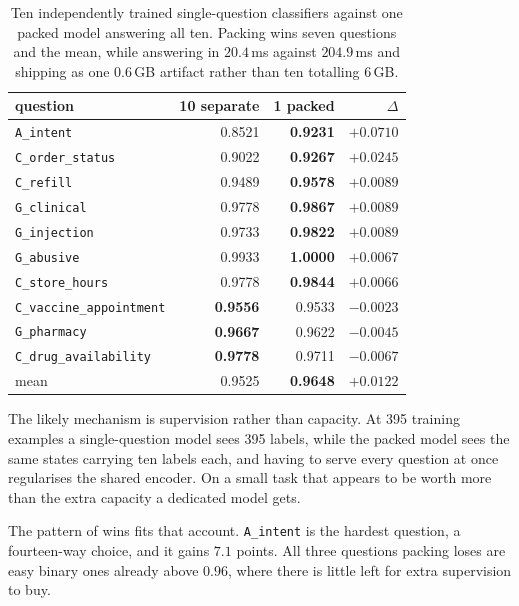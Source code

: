 \begin{table}[h]
\centering
\begin{tabular}{lrrr}
\toprule
question & 10 separate & 1 packed & $\Delta$ \\
\midrule
\texttt{A\_intent}              & 0.8521 & \textbf{0.9231} & $+0.0710$ \\
\texttt{C\_order\_status}       & 0.9022 & \textbf{0.9267} & $+0.0245$ \\
\texttt{C\_refill}              & 0.9489 & \textbf{0.9578} & $+0.0089$ \\
\texttt{G\_clinical}            & 0.9778 & \textbf{0.9867} & $+0.0089$ \\
\texttt{G\_injection}           & 0.9733 & \textbf{0.9822} & $+0.0089$ \\
\texttt{G\_abusive}             & 0.9933 & \textbf{1.0000} & $+0.0067$ \\
\texttt{C\_store\_hours}        & 0.9778 & \textbf{0.9844} & $+0.0066$ \\
\texttt{C\_vaccine\_appointment}& \textbf{0.9556} & 0.9533 & $-0.0023$ \\
\texttt{G\_pharmacy}            & \textbf{0.9667} & 0.9622 & $-0.0045$ \\
\texttt{C\_drug\_availability}  & \textbf{0.9778} & 0.9711 & $-0.0067$ \\
\midrule
mean                            & 0.9525 & \textbf{0.9648} & $+0.0122$ \\
\bottomrule
\end{tabular}
\caption{Ten independently trained single-question classifiers against one
packed model answering all ten. Packing wins seven questions and the mean,
while answering in $20.4$\,ms against $204.9$\,ms and shipping as one
$0.6$\,GB artifact rather than ten totalling $6$\,GB.}
\label{tab:separate}
\end{table}

The likely mechanism is supervision rather than capacity. At 395 training
examples a single-question model sees 395 labels, while the packed model
sees the same states carrying ten labels each, and having to serve every
question at once regularises the shared encoder. On a small task that
appears to be worth more than the extra capacity a dedicated model gets.

The pattern of wins fits that account. \texttt{A\_intent} is the hardest
question, a fourteen-way choice, and it gains $7.1$ points. All three
questions packing loses are easy binary ones already above $0.96$, where
there is little left for extra supervision to buy.

